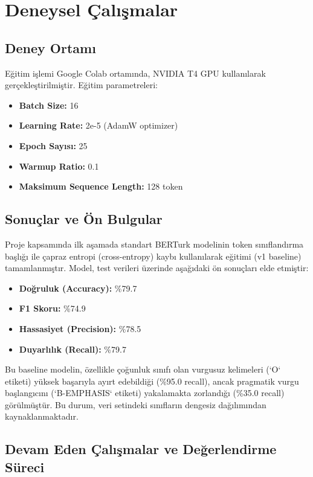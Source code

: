 \documentclass[conference]{IEEEtran}
\begin{document}
\section{Deneysel Çalışmalar}

\subsection{Deney Ortamı}
Eğitim işlemi Google Colab ortamında, NVIDIA T4 GPU kullanılarak gerçekleştirilmiştir. Eğitim parametreleri:
\begin{itemize}
    \item \textbf{Batch Size:} 16
    \item \textbf{Learning Rate:} 2e-5 (AdamW optimizer)
    \item \textbf{Epoch Sayısı:} 25
    \item \textbf{Warmup Ratio:} 0.1
    \item \textbf{Maksimum Sequence Length:} 128 token
\end{itemize}

\subsection{Sonuçlar ve Ön Bulgular}

Proje kapsamında ilk aşamada standart BERTurk modelinin token sınıflandırma başlığı ile çapraz entropi (cross-entropy) kaybı kullanılarak eğitimi (v1 baseline) tamamlanmıştır. Model, test verileri üzerinde aşağıdaki ön sonuçları elde etmiştir:
\begin{itemize}
    \item \textbf{Doğruluk (Accuracy):} \%79.7
    \item \textbf{F1 Skoru:} \%74.9
    \item \textbf{Hassasiyet (Precision):} \%78.5
    \item \textbf{Duyarlılık (Recall):} \%79.7
\end{itemize}

Bu baseline modelin, özellikle çoğunluk sınıfı olan vurgusuz kelimeleri (`O` etiketi) yüksek başarıyla ayırt edebildiği (\%95.0 recall), ancak pragmatik vurgu başlangıcını (`B-EMPHASIS` etiketi) yakalamakta zorlandığı (\%35.0 recall) görülmüştür. Bu durum, veri setindeki sınıfların dengesiz dağılımından kaynaklanmaktadır.

\subsection{Devam Eden Çalışmalar ve Değerlendirme Süreci}
\end{document}
